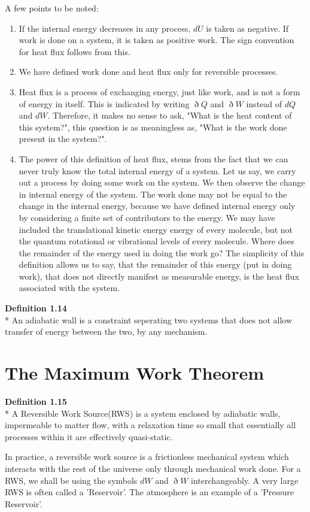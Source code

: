 \documentclass[oneside]{book}
\begin{document}
A few points to be noted:
\begin{enumerate}
    	\setcounter{enumi}{0}
		\item If the internal energy decreases in any process, $dU$ is taken as negative. If work is done on a system, it is taken as positive work. The sign convention for heat flux follows from this.
	\item We have defined work done and heat flux only for reversible processes.
	\item Heat flux is a process of exchanging energy, just like work, and is not a form of energy in itself. This is indicated by writing $\eth Q$ and $\eth W$ instead of $dQ$ and $dW$. Therefore, it makes no sense to ask, "What is the heat content of this system?", this question is as meaningless as, "What is the work done present in the system?".
	\item The power of this definition of heat flux, stems from the fact that we can never truly know the total internal energy of a system. Let us say, we carry out a process by doing some work on the system. We then observe the change in internal energy of the system. The work done may not be equal to the change in the internal energy, because we have defined internal energy only by considering a finite set of contributors to the energy. We may have included the translational kinetic energy energy of every molecule, but not the quantum rotational or vibrational levels of every molecule. Where does the remainder of the energy used in doing the work go? The simplicity of this definition allows us to say, that the remainder of this energy (put in doing work), that does not directly manifest as measurable energy, is the heat flux associated with the system. 
	\end{enumerate}	
	
	\begin{mdframed}[style=exercise]
\textbf{Definition 1.14}
 \\* An adiabatic wall is a constraint seperating two systems that does not allow transfer of energy between the two, by any mechanism.
\end{mdframed}

\section{The Maximum Work Theorem}

	\begin{mdframed}[style=exercise]
\textbf{Definition 1.15}
 \\* A Reversible Work Source(RWS) is a system enclosed by adiabatic walls, impermeable to matter flow, with a relaxation time so small that essentially all processes within it are effectively quasi-static.
\end{mdframed}
In practice, a reversible work source is a frictionless mechanical system which interacts with the rest of the universe only through mechanical work done. For a RWS, we shall be using the symbols $dW$ and $\eth W$ interchangeably. A very large RWS is often called a 'Reservoir'. The atmosphere is an example of a 'Pressure Reservoir'.
\end{document}
